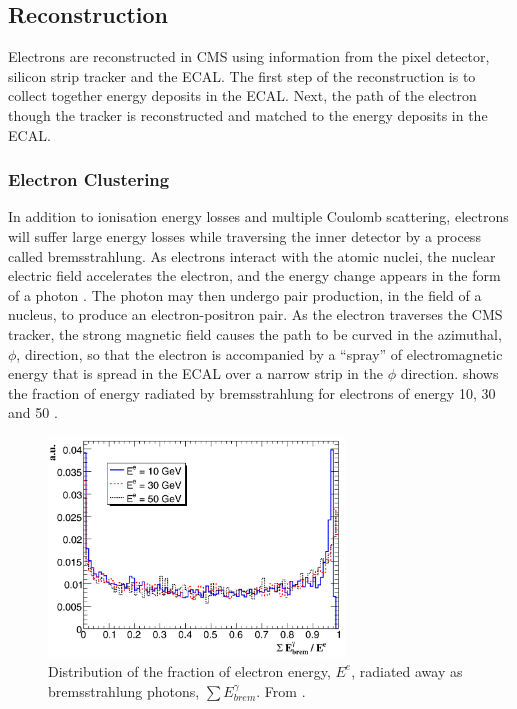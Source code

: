 \subsection{Reconstruction}
Electrons are reconstructed in CMS using information from the pixel detector,
silicon strip tracker and the ECAL.  The first step of the reconstruction is to
collect together energy deposits in the ECAL. Next, the path of the electron
though the tracker is reconstructed and matched to the energy deposits in the
ECAL\cite{baffioni2007electron,adam2009electron}.

\subsubsection{Electron Clustering}

In addition to ionisation energy losses and multiple Coulomb scattering,
electrons will suffer large energy losses while traversing the inner detector by
a process called bremsstrahlung.  As electrons interact with the atomic nuclei,
the nuclear electric field accelerates the electron, and the energy change
appears in the form of a photon \cite{perkins2000introduction}.  The photon may
then undergo pair production, in the field of a nucleus, to produce an
electron-positron pair.  As the electron traverses the CMS tracker, the strong
magnetic field causes the path to be curved in the azimuthal, $\phi$, direction,
so that the electron is accompanied by a ``spray'' of electromagnetic energy
that is spread in the ECAL over a narrow strip in the $\phi$ direction. 
 shows the fraction of energy radiated by bremsstrahlung for
electrons of energy 10, 30 and \unit{50}{\GeV} \cite{baffioni2007electron}.

\begin{figure}[htbp]
  \centering
  \includegraphics[width=0.7\textwidth]{brem}
  \caption[Distribution of the fraction of electron energy radiated away as
bremsstrahlung photons.] {Distribution of the fraction of electron energy,
$E^{e}$, radiated away as bremsstrahlung photons, $\sum E_{brem}^{\gamma}$. From
\cite{baffioni2007electron}.}
\label{fig:brem}
\end{figure}

